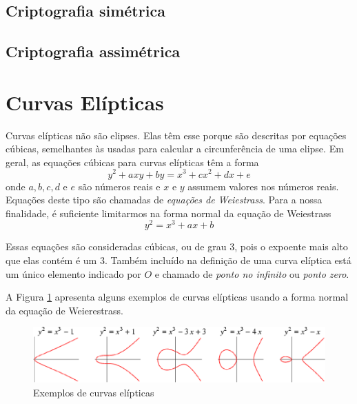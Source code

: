 %
%
\subsection{Criptografia simétrica}

%
%
\subsection{Criptografia assimétrica}

%
%
\section{Curvas Elípticas}
Curvas elípticas não são elipses. Elas têm esse porque são descritas por equações cúbicas, semelhantes às usadas para calcular a circunferência de uma elipse. Em geral, as equações cúbicas para curvas elípticas têm a forma
\begin{equation}
y^2 + axy + by = x^3 + cx^2 + dx + e \label{eq:11}
\end{equation}
onde \(a, b, c, d\) e \(e\) são números reais e \(x\) e \(y\) assumem valores nos números reais. Equações deste tipo são chamadas de \textit{equações de Weiestrass}. Para a nossa finalidade, é suficiente limitarmos na forma normal da equação de Weiestrass
\begin{equation}
y^2 = x^3 + ax + b \label{eq:12}
\end{equation}

Essas equações são consideradas cúbicas, ou de grau 3, pois o expoente mais alto que elas contém é um 3. Também incluído na definição de uma curva elíptica está um único elemento indicado por \(O\) e chamado de \textit{ponto no infinito} ou \textit{ponto zero}.

A Figura \ref{fig:curvas} apresenta alguns exemplos de curvas elípticas usando a forma normal da equação de Weierestrass.

\begin{figure}[h]
\centering
\includegraphics[scale=0.5, bb=0 0 529 101]{figuras/curvas.eps}
\caption{Exemplos de curvas elípticas}
\label{fig:curvas}
\end{figure}


